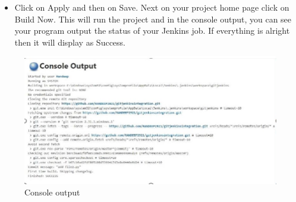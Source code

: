 \documentclass[12pt]{article}
\begin{document}
\begin{enumerate}
\begin{itemize}
\item Click on Apply and then on Save. Next on your project home page click on
Build Now. This will run the project and in the console output, you can see
your program output the status of your Jenkins job. If everything is alright
then it will display as Success.
\end{itemize}

\begin{figure}[H]
\centering
\includegraphics[scale=0.8]{fig83}
\caption{Console output}
\vspace{0.6\baselineskip}
\end{figure}



\end{enumerate}
\end{document}

